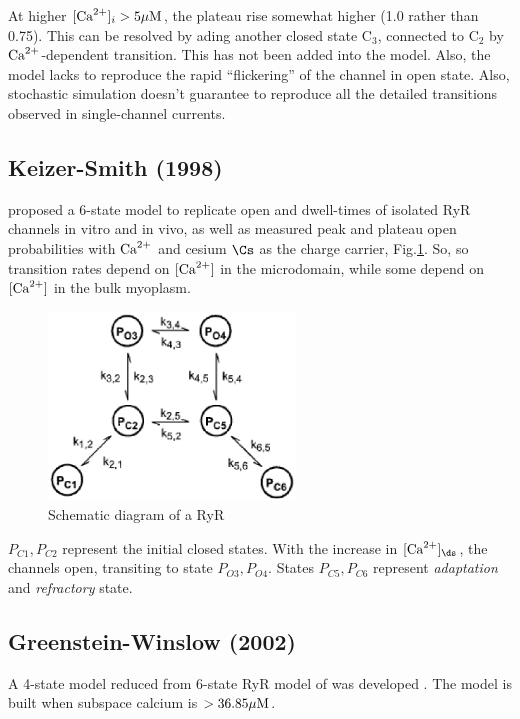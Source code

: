  At higher $[{\text{Ca}^{2+}}]_i > 5{\mu\text{M}}$, the plateau rise somewhat higher
(1.0 rather than 0.75). This can be resolved by ading another closed state C$_3$, connected to
C$_2$ by ${\text{Ca}^{2+}}$-dependent transition. This has not been added into the model.
Also, the model lacks to reproduce the rapid ``flickering'' of the channel in
open state. Also, stochastic simulation doesn't guarantee to reproduce all the
detailed transitions observed in single-channel currents.




\subsection{Keizer-Smith (1998)}
\label{sec:Keizer-Smith_98}

\citep{keizer1998} proposed a 6-state model to replicate open and dwell-times of
isolated RyR channels in vitro and in vivo, as well as measured peak and plateau
open probabilities with ${\text{Ca}^{2+}}$ and cesium $\Cs$ as the charge carrier,
Fig.\ref{fig:KeizerSmith_RyR}. So, so transition rates depend on $[{\text{Ca}^{2+}}]$ in the
microdomain, while some depend on $[{\text{Ca}^{2+}}]$ in the bulk myoplasm.

\begin{figure}[hbt]
  \centerline{\includegraphics[height=5cm]{./images/KeizerSmith_RyR.eps}}
\caption{Schematic diagram of a RyR}
\label{fig:KeizerSmith_RyR}
\end{figure}

$P_{C1}, P_{C2}$ represent the initial closed states. With the increase in
$[\Ca]_\ds$, the channels open, transiting to state $P_{O3}, P_{O4}$. States
$P_{C5}, P_{C6}$ represent {\it adaptation} and {\it refractory} state.


\subsection{Greenstein-Winslow (2002)}
\label{sec:greenstein_winslow_RyR}

A 4-state model reduced from 6-state RyR model of \citep{keizer1998} was
developed \citep{greenstein2002}. The model is built when subspace calcium is $>
36.85 {\mu\text{M}}$.

